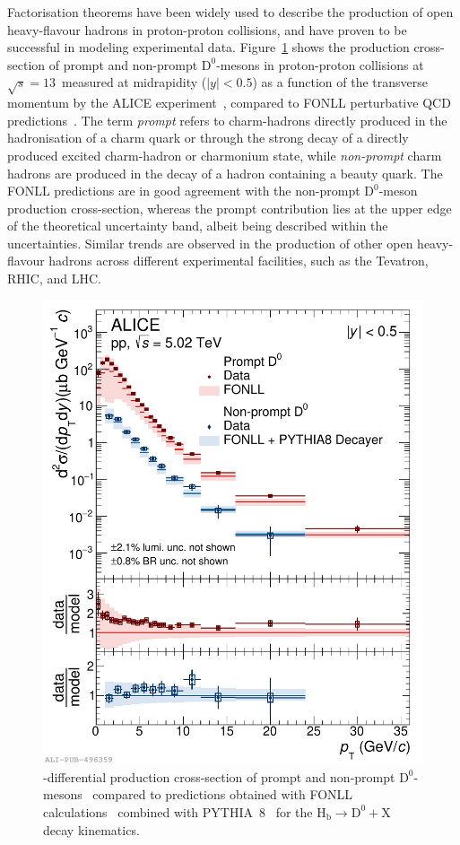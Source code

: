 Factorisation theorems have been widely used to describe the production of open heavy-flavour hadrons in proton-proton collisions, and have proven to be successful in modeling experimental data. Figure~\ref{fig:ppDmeson} shows the production cross-section of prompt and non-prompt $\mathrm{D^0}$-mesons in proton-proton collisions at $\sqrt{s} = 13$~\tev measured at midrapidity ($\lvert y\rvert<0.5$) as a function of the transverse momentum by the ALICE experiment~\cite{ALICE:2021mgk}, compared to FONLL perturbative QCD predictions~\cite{Cacciari:1998it}. The term \emph{prompt} refers to charm-hadrons directly produced in the hadronisation of a charm quark or through the strong decay of a directly produced excited charm-hadron or charmonium state, while \emph{non-prompt} charm hadrons are produced in the decay of a hadron containing a beauty quark. The FONLL predictions are in good agreement with the non-prompt $\mathrm{D^0}$-meson production cross-section, whereas the prompt contribution lies at the upper edge of the theoretical uncertainty band, albeit being described within the uncertainties. Similar trends are observed in the production of other open heavy-flavour hadrons across different experimental facilities, such as the Tevatron, RHIC, and LHC.
\begin{figure}[htb]
    \centering
    \includegraphics[width=0.6\linewidth]{Figures/Chapter 2/CrossSectionD0_Prompt_NonPrompt_pp5TeV_vsFONLL_Pythia8_BRnative_1.pdf}
    \caption{\pt-differential production cross-section of prompt and non-prompt $\mathrm{D^0}$-mesons~\cite{ALICE:2021mgk} compared to predictions obtained with FONLL calculations~\cite{Cacciari:1998it} combined with PYTHIA~8~\cite{Sjostrand:2014zea} for the $\mathrm{H_b \rightarrow D^0+X}$ decay kinematics.}
    \label{fig:ppDmeson}
\end{figure}

